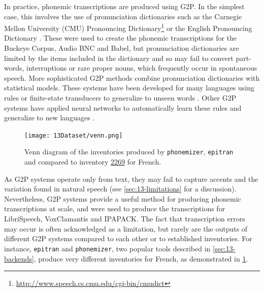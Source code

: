 In practice, phonemic transcriptions are produced using G2P. In the simplest case, this involves the use of pronunciation dictionaries such as the Carnegie Mellon University (CMU) Pronouncing Dictionary\footnote{\url{http://www.speech.cs.cmu.edu/cgi-bin/cmudict}} or the English Pronouncing Dictionary \citep{jones2011cambridge}. These were used to create the phonemic transcriptions for the Buckeye Corpus, Audio BNC and Babel, but pronunciation dictionaries are limited by the items included in the dictionary and so may fail to convert part-words, interruptions or rare proper nouns, which frequently occur in spontaneous speech. More sophisticated G2P methods combine pronunciation dictionaries with statistical models. These systems have been developed for many languages using rules or finite-state transducers to generalize to unseen words \citep{Mortensen-et-al:2018, johnson2020g2p, Bernard2021}. Other G2P systems have applied neural networks to automatically learn these rules and generalize to new languages \citep{NOVAK_MINEMATSU_HIROSE_2016, Zhu2022}.


\begin{figure}[t]
    \centering
    \texttt{[image: 13Dataset/venn.png]}
    \caption{Venn diagram of the inventories produced by \texttt{phonemizer}, \texttt{epitran} and \gpp compared to \phoible inventory \href{https://phoible.org/inventories/view/2269}{2269} for French.}
    \label{fig:13-venn}
\end{figure}

As G2P systems operate only from text, they may fail to capture accents and the variation found in natural speech (see \cref{sec:13-limitations} for a discussion). Nevertheless, G2P systems provide a useful method for producing phonemic transcriptions at scale, and were used to produce the transcriptions for LibriSpeech, VoxClamantis and IPAPACK. The fact that transcription errors may occur is often acknowledged as a limitation, but rarely are the outputs of different G2P systems compared to each other or to established inventories. For instance, \texttt{epitran} and \texttt{phonemizer}, two popular tools described in \cref{sec:13-backends}, produce very different inventories for French, as demonstrated in \cref{fig:13-venn}. 

